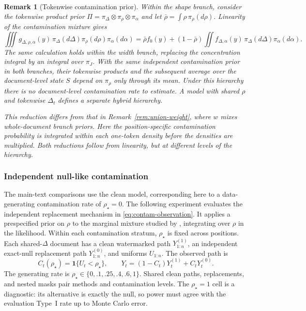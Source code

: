 \documentclass[11pt]{article}
\newtheorem{remark}{Remark}
\newcommand{\ind}{\mathbf 1}
\begin{document}
\begin{remark}[Tokenwise contamination prior]
\label{rem:tokenwise-rho}
Within the shape branch, consider the tokenwise product prior $\Pi=\pi_\Delta\otimes\pi_\rho\otimes\pi_\alpha$ and let
$\bar\rho=\int\rho\,\pi_\rho(d\rho)$.  Linearity of the contamination mixture gives
\begin{equation}
  \iiint g_{\Delta,\rho,\alpha}(y)\,
  \pi_\Delta(d\Delta)\pi_\rho(d\rho)\pi_\alpha(d\alpha)
  =\bar\rho f_0(y)
   +(1-\bar\rho)\iint f_{\Delta,\alpha}(y)\,
   \pi_\Delta(d\Delta)\pi_\alpha(d\alpha).
  \label{eq:token-rho-collapse}
\end{equation}
The same calculation holds within the width branch, replacing the concentration integral by an integral over $\pi_J$.  With the same independent contamination prior in both branches, their tokenwise products and the subsequent average over the document-level state $S$ depend on $\pi_\rho$ only through its mean.  Under this hierarchy there is no document-level contamination rate to estimate.  A model with shared $\rho$ and tokenwise $\Delta_t$ defines a separate hybrid hierarchy.

This reduction differs from that in Remark~\ref{rem:union-weight}, where $w$
mixes whole-document branch priors.  Here the position-specific contamination
probability is integrated within each one-token density before the densities are
multiplied.  Both reductions follow from linearity, but at different levels of
the hierarchy.
\end{remark}

\subsubsection{Independent null-like contamination}
\label{sec:contamination}

The main-text comparisons use the clean model, corresponding here to a data-generating contamination rate of $\rho_\star=0$.  The following experiment evaluates the independent replacement mechanism in \eqref{eq:contam-observation}.  It applies a prespecified prior on $\rho$ to the marginal mixture studied by \citet{li2024robust}, integrating over $\rho$ in the likelihood.  Within each contamination stratum, $\rho_\star$ is fixed across positions.  Each shared-$\Delta$ document has a clean watermarked path $Y^{(1)}_{1:n}$, an independent exact-null replacement path $Y^{(0)}_{1:n}$, and uniforms $U_{1:n}$.  The observed path is
\begin{equation}
  C_t(\rho_\star)=\ind\{U_t<\rho_\star\},
  \qquad
  Y_t=(1-C_t)Y_t^{(1)}+C_tY_t^{(0)}.
  \label{eq:contamination-experiment}
\end{equation}
The generating rate is $\rho_\star\in\{0,.1,.25,.4,.6,1\}$.  Shared clean paths, replacements, and nested masks pair methods and contamination levels.  The $\rho_\star=1$ cell is a diagnostic: its alternative is exactly the null, so power must agree with the evaluation Type~I rate up to Monte Carlo error.
\end{document}
